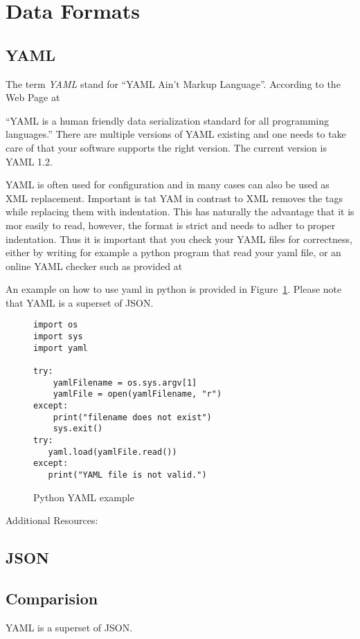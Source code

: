 \section{Data Formats}

\subsection{YAML}

The term \emph{YAML} stand for ``YAML Ain't Markup
Language''. According to the Web Page at 


``YAML is a human friendly data serialization standard for all
programming languages.'' There are multiple versions of YAML existing
and one needs to take care of that your software supports the right
version. The current version is YAML 1.2.

YAML is often used for configuration and in many cases can also be
used as XML replacement. Important is tat YAM in contrast to XML
removes the tags while replacing them with indentation. This has
naturally the advantage that it is mor easily to read, however, the
format is strict and needs to adher to proper indentation. Thus it is
important that you check your YAML files for correctness, either by
writing for example a python program that read your yaml file, or an
online YAML checker such as provided at 


An example on how to use yaml in python is provided in
Figure~\ref{F:yaml}. Please note that YAML is a superset of JSON.

\begin{figure}[htb]
\begin{lstlisting}
import os
import sys
import yaml

try:
    yamlFilename = os.sys.argv[1]
    yamlFile = open(yamlFilename, "r")
except:
    print("filename does not exist")
    sys.exit()
try:
   yaml.load(yamlFile.read())
except:
   print("YAML file is not valid.")
\end{lstlisting}
\caption{Python YAML example}\label{F:yaml}
\end{figure}

Additional Resources: 




\subsection{JSON}



\subsection{Comparision}


YAML is a superset of JSON. 

